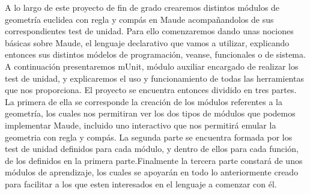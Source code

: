 
A lo largo de este proyecto de fin de grado crearemos distintos módulos de geometría euclidea con regla y compás en Maude acompañandolos de sus correspondientes test de unidad. Para ello comenzaremos dando unas nociones básicas sobre Maude, el lenguaje declarativo que vamos a utilizar, explicando entonces sus distintos módelos de programación, veanse, funcionales o de sistema. A continuación presentaremos mUnit, módulo auxiliar encargado de realizar los test de unidad, y explicaremos el uso y funcionamiento de todas las herramientas que nos proporciona. El proyecto se encuentra entonces dividido en tres partes. La primera de ella se corresponde la creación de los módulos referentes a la geometría, los cuales nos permitiran ver los dos tipos de módulos que podemos implementar Maude, incluido uno interactivo que nos permitirá emular la geometria con regla y compás. La segunda parte se encuentra formada por los test de unidad definidos para cada módulo, y dentro de ellos para cada función, de los definidos en la primera parte.Finalmente la tercera parte constará de unos módulos de aprendizaje, los cuales se apoyarán en todo lo anteriormente creado para facilitar a los que esten interesados en el lenguaje a comenzar con él. \par
